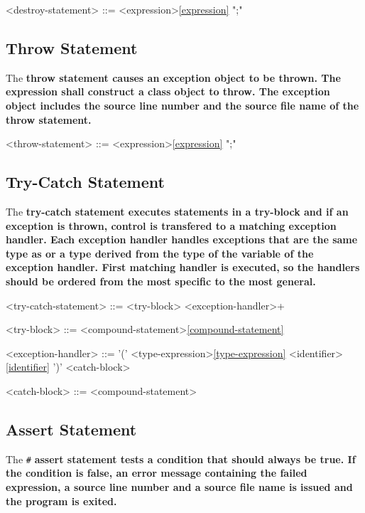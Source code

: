 \documentclass[a4paper,oneside,11pt]{article}
\begin{document}
\begin{grammar}
\label{destroy-statement}<destroy-statement> ::=  <expression>\ref{expression} ";"
\end{grammar}

\subsection{Throw Statement}

The \bf{throw} statement causes an exception object to be thrown. The expression shall construct a class object to throw.
The exception object includes the source line number and the source file name of the throw statement.

\begin{grammar}
\label{throw-statement}<throw-statement> ::=  <expression>\ref{expression} ";"
\end{grammar}

\subsection{Try-Catch Statement}

The \bf{try-catch} statement executes statements in a try-block and if an exception is thrown, control is transfered
to a matching exception handler. Each exception handler handles exceptions that are the same type as or a type derived from
the type of the variable of the exception handler. First matching handler is executed, so the handlers should be
ordered from the most specific to the most general.

\begin{grammar}
\label{try-catch-statement}<try-catch-statement> ::=  <try-block> <exception-handler>+

<try-block> ::= <compound-statement>\ref{compound-statement}

<exception-handler> ::=  '(' <type-expression>\ref{type-expression} <identifier>\ref{identifier} ')' <catch-block>

<catch-block> ::= <compound-statement>
\end{grammar}

\subsection{Assert Statement}

The \verb|#| \bf{assert} statement tests a condition that should always be true.
If the condition is false, an error message containing the failed expression, a source line number and a source file name is issued and the program is exited.
\end{document}
